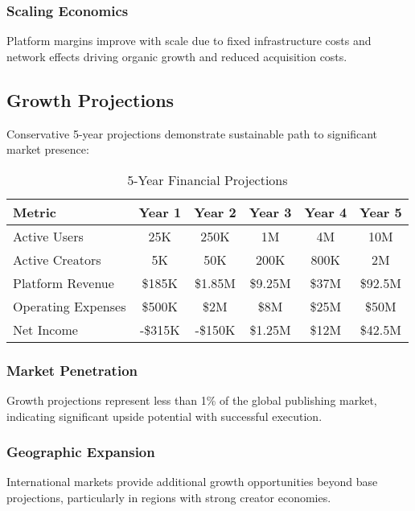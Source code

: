 \subsubsection{Scaling Economics}

Platform margins improve with scale due to fixed infrastructure costs and network effects driving organic growth and reduced acquisition costs.

\subsection{Growth Projections}

Conservative 5-year projections demonstrate sustainable path to significant market presence:

\begin{table}[H]
\centering
\caption{5-Year Financial Projections}
\label{tab:financial-projections}
\begin{tabular}{@{}lccccc@{}}
\toprule
\textbf{Metric} & \textbf{Year 1} & \textbf{Year 2} & \textbf{Year 3} & \textbf{Year 4} & \textbf{Year 5} \\
\midrule
Active Users & 25K & 250K & 1M & 4M & 10M \\
Active Creators & 5K & 50K & 200K & 800K & 2M \\
Platform Revenue & \$185K & \$1.85M & \$9.25M & \$37M & \$92.5M \\
Operating Expenses & \$500K & \$2M & \$8M & \$25M & \$50M \\
Net Income & -\$315K & -\$150K & \$1.25M & \$12M & \$42.5M \\
\bottomrule
\end{tabular}
\end{table}

\subsubsection{Market Penetration}

Growth projections represent less than 1\% of the global publishing market, indicating significant upside potential with successful execution.

\subsubsection{Geographic Expansion}

International markets provide additional growth opportunities beyond base projections, particularly in regions with strong creator economies.

